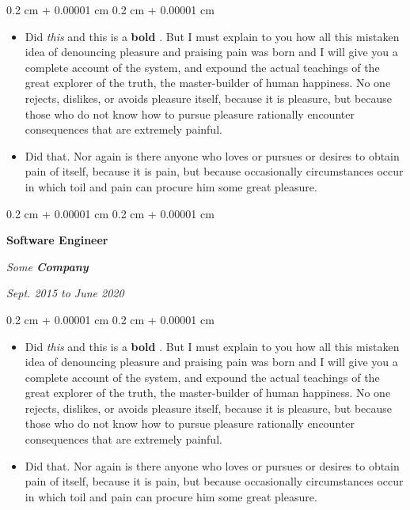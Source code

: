 \documentclass[10pt, letterpaper]{article}
\newenvironment{highlights}{
    \begin{itemize}[
        topsep=0.10 cm,
        parsep=0.10 cm,
        partopsep=0pt,
        itemsep=0pt,
        leftmargin=0.4 cm + 10pt
    ]
}{
    \end{itemize}
} %
\newenvironment{onecolentry}{
    \begin{adjustwidth}{
        0.2 cm + 0.00001 cm
    }{
        0.2 cm + 0.00001 cm
    }
}{
    \end{adjustwidth}
} %
\newenvironment{twocolentry}[2][]{
    \onecolentry
    \def\secondColumn{#2}
    \setcolumnwidth{\fill, 4.5 cm}
    \begin{paracol}{2}
}{
    \switchcolumn \raggedleft \secondColumn
    \end{paracol}
    \endonecolentry
} %
\let\hrefWithoutArrow\href
\renewcommand{\href}[2]{\hrefWithoutArrow{#1}{\mbox{\ifthenelse{\equal{#2}{}}{ }{#2 }\raisebox{.15ex}{\footnotesize \faExternalLink*}}}}
\begin{document}
        \vspace{0.10 cm-3px}
        \begin{onecolentry}
            \begin{highlights}
                \item Did \textit{this} and this is a \textbf{bold} \href{https://example.com}{link}. But I must explain to you how all this mistaken idea of denouncing pleasure and praising pain was born and I will give you a complete account of the system, and expound the actual teachings of the great explorer of the truth, the master-builder of human happiness. No one rejects, dislikes, or avoids pleasure itself, because it is pleasure, but because those who do not know how to pursue pleasure rationally encounter consequences that are extremely painful.
                \item Did that. Nor again is there anyone who loves or pursues or desires to obtain pain of itself, because it is pain, but because occasionally circumstances occur in which toil and pain can procure him some great pleasure.
            \end{highlights}
        \end{onecolentry}


        \vspace{0.2 cm-3px}

        \begin{twocolentry}{
            
            
        \textit{Sept. 2015 to June 2020}}
            \textbf{Software Engineer}
            
            \textit{Some \textbf{Company}}
        \end{twocolentry}

        \vspace{0.10 cm-3px}
        \begin{onecolentry}
            \begin{highlights}
                \item Did \textit{this} and this is a \textbf{bold} \href{https://example.com}{link}. But I must explain to you how all this mistaken idea of denouncing pleasure and praising pain was born and I will give you a complete account of the system, and expound the actual teachings of the great explorer of the truth, the master-builder of human happiness. No one rejects, dislikes, or avoids pleasure itself, because it is pleasure, but because those who do not know how to pursue pleasure rationally encounter consequences that are extremely painful.
                \item Did that. Nor again is there anyone who loves or pursues or desires to obtain pain of itself, because it is pain, but because occasionally circumstances occur in which toil and pain can procure him some great pleasure.
            \end{highlights}
        \end{onecolentry}
\end{document}
